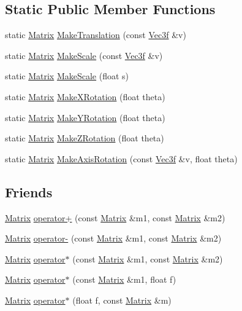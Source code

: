 \subsection*{Static Public Member Functions}
\begin{DoxyCompactItemize}
\item 
static \hyperlink{classMatrix}{Matrix} \hyperlink{classMatrix_a2b1cb490a87242c87a70663740da4ec5}{Make\+Translation} (const \hyperlink{classVec3f}{Vec3f} \&v)
\item 
static \hyperlink{classMatrix}{Matrix} \hyperlink{classMatrix_abf53a10add62314631229fc752cd8c84}{Make\+Scale} (const \hyperlink{classVec3f}{Vec3f} \&v)
\item 
static \hyperlink{classMatrix}{Matrix} \hyperlink{classMatrix_a503eab51a48058e56e60b6199bb1b8e8}{Make\+Scale} (float s)
\item 
static \hyperlink{classMatrix}{Matrix} \hyperlink{classMatrix_a2e1addd0f882e4ce73264258525f70e0}{Make\+X\+Rotation} (float theta)
\item 
static \hyperlink{classMatrix}{Matrix} \hyperlink{classMatrix_a0848f661169a85ca7ee24f1d7b30aa80}{Make\+Y\+Rotation} (float theta)
\item 
static \hyperlink{classMatrix}{Matrix} \hyperlink{classMatrix_a10fcfa34357b477fd80c25b31e2d9105}{Make\+Z\+Rotation} (float theta)
\item 
static \hyperlink{classMatrix}{Matrix} \hyperlink{classMatrix_a2134c6c917c3bf24797c1202f56d9e82}{Make\+Axis\+Rotation} (const \hyperlink{classVec3f}{Vec3f} \&v, float theta)
\end{DoxyCompactItemize}
\subsection*{Friends}
\begin{DoxyCompactItemize}
\item 
\hyperlink{classMatrix}{Matrix} \hyperlink{classMatrix_aa5a9f2db2b3c1862c9c0d19241239ce7}{operator+} (const \hyperlink{classMatrix}{Matrix} \&m1, const \hyperlink{classMatrix}{Matrix} \&m2)
\item 
\hyperlink{classMatrix}{Matrix} \hyperlink{classMatrix_a52ad5ef4b9998529c85e8523c20d6b86}{operator-\/} (const \hyperlink{classMatrix}{Matrix} \&m1, const \hyperlink{classMatrix}{Matrix} \&m2)
\item 
\hyperlink{classMatrix}{Matrix} \hyperlink{classMatrix_a24da5fd1a21f5010ee32de71af9be3b9}{operator$\ast$} (const \hyperlink{classMatrix}{Matrix} \&m1, const \hyperlink{classMatrix}{Matrix} \&m2)
\item 
\hyperlink{classMatrix}{Matrix} \hyperlink{classMatrix_a895d86a3588e50c3aa51f0e43b43de39}{operator$\ast$} (const \hyperlink{classMatrix}{Matrix} \&m1, float f)
\item 
\hyperlink{classMatrix}{Matrix} \hyperlink{classMatrix_a900892d8498953af4e4606741601c017}{operator$\ast$} (float f, const \hyperlink{classMatrix}{Matrix} \&m)
\end{DoxyCompactItemize}



